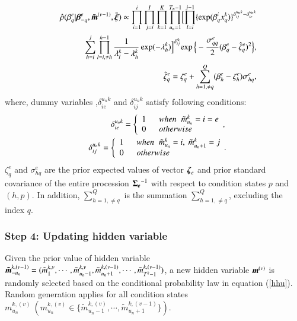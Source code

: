\documentclass[a4paper,oneside,onecolumn,preprint,10pt,authoryear]{elsarticle}
\begin{document}
\begin{eqnarray}
      && \hat{\rho}(\beta_{q}^e|\mbox{\boldmath$\beta$}_{-q}^e,\tilde{\mbox{\boldmath$m$}}^{(v-1)},
      \bar{\mbox{\boldmath$\xi$}}) 
      \propto
\prod_{i=1}^{i} \prod_{j=i}^I \prod_{k=1}^K  \prod_{u_n=1}^{T_n-1} \Bigl[ \prod_{l=i}^{j-1} \{\exp(\beta_{q}^i x_q^k)\}^{\delta_{ij}^{u_nk}-\delta_{ie}^{u_nk}}  \nonumber \\
     && \hspace{2mm} \sum_{h=i}^{j} \prod_{l=i,\neq h}^{h-1}\frac{1}{\lambda_{l}^k-\lambda_{h}^k} \exp (-\lambda_{h}^k)\Bigl]^{\delta_{ij}^{tk}}
 \exp\Big\{-\frac{\sigma_{qq}^e}{2}(\beta_{q}^e-\hat{\zeta}_{q}^e)^2 \Big\}, \nonumber \\
&& \hspace{10mm}
      \hat{\zeta}_{q}^e
      = \zeta_{q}^e+\sum_{h=1,\neq q}^{Q}(\beta_{h}^e-\zeta_h^{e})\sigma_{hq}^e,
       \label{condition2}
      \end{eqnarray}
where, dummy variables ,$\delta_{ie}^{u_nk}$ and $\delta_{ij}^{u_nk}$ satisfy following conditions:
\begin{eqnarray}
&& \delta_{ie}^{u_nk}=\left\{
\begin{array}{ll}
1 & \hspace{2mm} when \hspace{2mm}\tilde{m}_{u_n}^k=i=e\\
0 & \hspace{2mm} otherwise
\end{array},
\right. \nonumber \\
&& \delta_{ij}^{u_nk}=\left\{
\begin{array}{ll}
1 & \hspace{2mm} when \hspace{2mm}\tilde{m}_{u_n}^k=i,~\tilde{m}_{u_n+1}^k=j\\
0 & \hspace{2mm} otherwise
\end{array}.
\right. \nonumber
\end{eqnarray}
$\zeta_{q}^e$ and $\sigma_{hq}^{e}$ are the prior expected values of vector $\mbox{\boldmath$\zeta$}_e$ and prior standard covariance of the entire procession $\mbox{\boldmath$\Sigma_e$}^{-1}$ with respect to condition states $p$ and $(h,p)$. In addition, $\sum_{h=1,\neq q}^{Q}$ is the summation $\sum_{h=1,\neq q}^{Q}$, excluding the index $q$.
\subsubsection{Step 4: Updating hidden variable}  \label{sec554}
Given the prior value of hidden variable $\mbox{\boldmath$\tilde{m}$}_{-u_n}^{k,(v-1)}=(\tilde{m}_1^{k,v},\cdots,\tilde{m}_{u_n-1}^{k,v},\tilde{m}_{u_n+1}^{k,(v-1)},\cdots,\tilde{m}_{T^k-1}^{k,(v-1)})$, a new hidden variable $\mbox{\boldmath$m$}^{(v)}$ is randomly selected based on the conditional probability law in equation (\ref{hhu}). Random generation applies for all condition states $m_{u_n}^{k,(v)} ~(m_{u_n}^{k,(v)} \in \{\tilde{m}_{u_n-1}^{k,(v)},\cdots, \tilde{m}_{u_n+1}^{k,(v-1)}\})$. 
\end{document}
